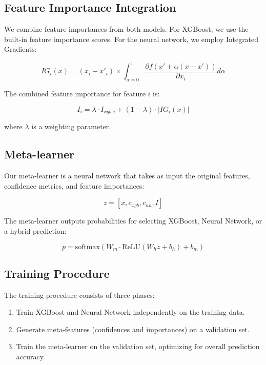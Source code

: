 \documentclass[10pt,journal,compsoc]{IEEEtran}
\begin{document}
\subsection{Feature Importance Integration}

We combine feature importances from both models. For XGBoost, we use the built-in feature importance scores. For the neural network, we employ Integrated Gradients:

\begin{equation}
    IG_i(x) = (x_i - x'_i) \times \int_{\alpha=0}^1 \frac{\partial f(x' + \alpha(x-x'))}{\partial x_i} d\alpha
\end{equation}

The combined feature importance for feature $i$ is:

\begin{equation}
    I_i = \lambda \cdot I_{xgb,i} + (1-\lambda) \cdot |IG_i(x)|
\end{equation}

where $\lambda$ is a weighting parameter.

\subsection{Meta-learner}

Our meta-learner is a neural network that takes as input the original features, confidence metrics, and feature importances:

\begin{equation}
    z = [x, c_{xgb}, c_{nn}, I]
\end{equation}

The meta-learner outputs probabilities for selecting XGBoost, Neural Network, or a hybrid prediction:

\begin{equation}
    p = \text{softmax}(W_m \cdot \text{ReLU}(W_h z + b_h) + b_m)
\end{equation}

\subsection{Training Procedure}

The training procedure consists of three phases:

\begin{enumerate}
    \item Train XGBoost and Neural Network independently on the training data.
    \item Generate meta-features (confidences and importances) on a validation set.
    \item Train the meta-learner on the validation set, optimizing for overall prediction accuracy.
\end{enumerate}
\end{document}
